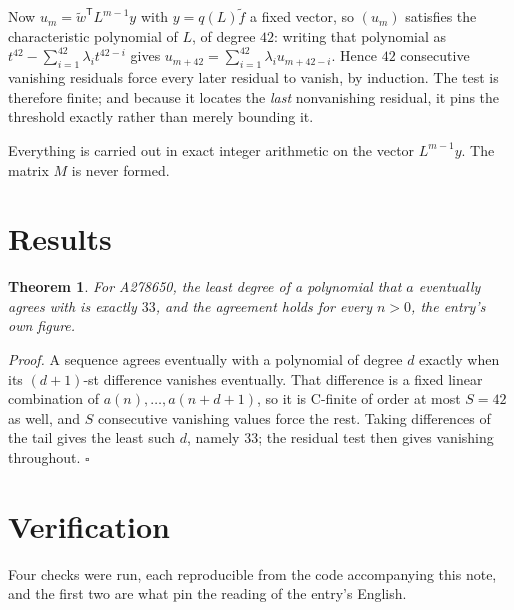 \documentclass[11pt]{article}
\newtheorem{theorem}{Theorem}
\theoremstyle{definition}
\begin{document}
Now $u_m = \tilde w^{\mathsf T} L^{m-1} y$ with $y = q(L)\tilde f$ a fixed vector, so $(u_m)$ satisfies the characteristic polynomial of $L$, of degree $42$: writing that polynomial as $t^{42} - \sum_{i=1}^{42} \lambda_i t^{42-i}$ gives $u_{m+42} = \sum_{i=1}^{42} \lambda_i u_{m+42-i}$. Hence $42$ consecutive vanishing residuals force every later residual to vanish, by induction. The test is therefore finite; and because it locates the {\itshape last} nonvanishing residual, it pins the threshold exactly rather than merely bounding it.

Everything is carried out in exact integer arithmetic on the vector $L^{m-1}y$. The matrix $M$ is never formed.

\section{Results}

\begin{theorem} For A278650, the least degree of a polynomial that $a$ eventually agrees with is exactly $33$, and the agreement holds for every $n > 0$, the entry's own figure.\end{theorem}

{\itshape Proof.} A sequence agrees eventually with a polynomial of degree $d$ exactly when its $(d+1)$-st difference vanishes eventually. That difference is a fixed linear combination of $a(n),\dots,a(n+d+1)$, so it is C-finite of order at most $S = 42$ as well, and $S$ consecutive vanishing values force the rest. Taking differences of the tail gives the least such $d$, namely $33$; the residual test then gives vanishing throughout. $\square$

\section{Verification}

Four checks were run, each reproducible from the code accompanying this note, and the first two are what pin the reading of the entry's English.
\end{document}
